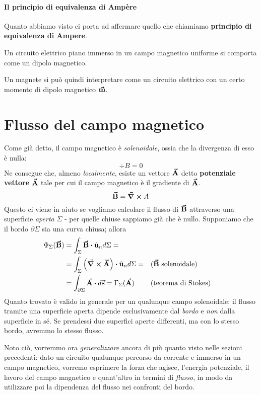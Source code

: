 \paragraph{Il principio di equivalenza di Ampère}
Quanto abbiamo visto ci porta ad affermare quello che chiamiamo \textbf{principio di equivalenza di Ampere}.
\begin{theoremaqed}
	Un circuito elettrico piano immerso in un campo magnetico uniforme si comporta come un dipolo magnetico.
\end{theoremaqed}%
Un magnete si può quindi interpretare come un circuito elettrico con un certo momento di dipolo magnetico $\vb*{\va{m}}$.
\section{Flusso del campo magnetico}
Come già detto, il campo magnetico è \textit{solenoidale}, ossia che la divergenza di esso è nulla:
\begin{equation*}
	\div{B}=0
\end{equation*}
Ne consegue che, almeno \textit{localmente}, esiste un vettore $\vb*{\va{A}}$ detto \textbf{potenziale vettore} $\vb*{\va{A}}$ tale per cui il campo magnetico è il gradiente di $\vb*{\va{A}}$.
\begin{equation}
	\vb*{\va{B}}=\curl{A}
\end{equation}
Questo ci viene in aiuto se vogliamo calcolare il flusso di $\vb*{\va{B}}$ attraverso una superficie \textit{aperta} $\Sigma$ - per quelle chiuse sappiamo già che è nullo. Supponiamo che il bordo $\partial \Sigma$ sia una curva chiusa; allora
\begin{align*}
	\Phi_{\Sigma}(\vba{B})&=\int_{\Sigma}\vba{B}\vdot\vbh{u}_nd\Sigma=\\
	&=\int_{\Sigma}\left(\curl{\vba{A}}\right)\vdot\vbh{u}_nd\Sigma=&&\text{(}\vba{B}\ \text{solenoidale)}\\
	&=\int_{\partial \Sigma}\vba{A}\vdot d\vba{s}=\Gamma_{\Sigma}(\vba{A})&&\text{(teorema di Stokes)}
\end{align*}
Quanto trovato è valido in generale per un qualunque campo solenoidale: il flusso tramite una superficie aperta dipende esclusivamente dal \textit{bordo} e \textit{non} dalla superficie in sé. Se prendessi due superfici aperte differenti, ma con lo stesso bordo, avremmo lo stesso flusso.

Noto ciò, vorremmo ora \textit{generalizzare} ancora di più quanto visto nelle sezioni precedenti: dato un circuito qualunque percorso da corrente e immerso in un campo magnetico, vorremo esprimere la forza che agisce, l'energia potenziale, il lavoro del campo magnetico e quant'altro in termini di \textit{flusso}, in modo da utilizzare poi la dipendenza del flusso nei confronti del bordo.

